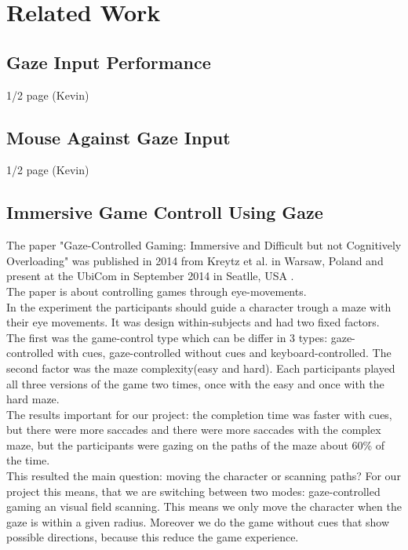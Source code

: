 \documentclass{sigchi}
\begin{document}
\section{Related Work}
\subsection{Gaze Input Performance}
\cite{san2009evaluation} 1/2 page (Kevin)
\subsection{Mouse Against Gaze Input}
\cite{dorr2009gaze} 1/2 page (Kevin)
\subsection{Immersive Game Controll Using Gaze}
The paper "Gaze-Controlled Gaming: Immersive and Difficult but not Cognitively Overloading" was published in 2014 from Kreytz et al. in Warsaw, Poland and present at the UbiCom in September 2014 in Seatlle, USA \cite{krejtz2014gaze}.\\
The paper is about controlling games through eye-movements.\\
In the experiment the participants should guide a character trough a maze with their eye movements. It was design within-subjects and had two fixed factors. The first was the game-control type which can be differ in 3 types: gaze-controlled with cues, gaze-controlled without cues and keyboard-controlled. The second factor was the maze complexity(easy and hard). Each participants played all three versions of the game two times, once with the easy and once with the hard maze.\\
The results important for our project: the completion time was faster with cues, but there were more saccades and there were more saccades with the complex maze, but the participants were gazing on the paths of the maze about 60\% of the time.\\
This resulted the main question: moving the character or scanning paths? For our project this means, that we are switching between two modes: gaze-controlled gaming an visual field scanning. This means we only move the character when the gaze is within a given radius. Moreover we do the game without cues that show possible directions, because this reduce the game experience. 
\end{document}
